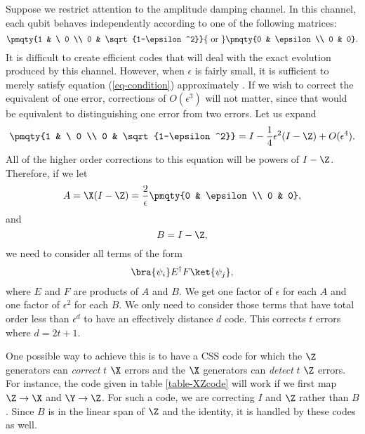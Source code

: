 Suppose we restrict attention to the amplitude damping channel.  In this
channel, each qubit behaves independently according to one of the following
matrices:
\begin{equation}
	\pmqty{1 & \ 0 \\ 0 & \sqrt{1-\epsilon^2}} {\rm\ or\ }
	\pmqty{0 & \epsilon \\ 0 & 0}.
\end{equation}
It is difficult to create efficient codes that will deal with the exact
evolution produced by this channel.  However, when $\epsilon$ is fairly small,
it is sufficient to merely satisfy equation (\ref{eq-condition}) approximately
\cite{leung}.  If we wish to correct the equivalent of one error, corrections
of $O(\epsilon^3)$ will not matter, since that would be equivalent to
distinguishing one error from two errors.  Let us expand
\begin{equation}
	\pmqty{1 & \ 0 \\ 0 & \sqrt{1-\epsilon^2}} =
	I - \frac{1}{4} \epsilon^2 (I - \Z) + O(\epsilon^4).
\end{equation}
All of the higher order corrections to this equation will be powers of
$I - \Z$.  Therefore, if we let
\begin{equation}
	A = \X (I - \Z) = \frac{2}{\epsilon} \pmqty{0 & \epsilon \\ 0 & 0},
\end{equation}
and
\begin{equation}
	B = I - \Z,
\end{equation}
we need to consider all terms of the form
\begin{equation}
	\bra{\psi_i} E^\dagger F \ket{\psi_j},
\end{equation}
where $E$ and $F$ are products of $A$ and $B$.  We get one factor of $\epsilon$
for each $A$ and one factor of $\epsilon^2$ for each $B$.  We only need to
consider those terms that have total order less than $\epsilon^d$ to have an
effectively distance $d$ code.  This corrects $t$ errors where $d= 2t+1$.

One possible way to achieve this is to have a CSS code for which the $\Z$
generators can {\em correct} $t$ $\X$ errors and the $\X$ generators can
	{\em detect} $t$ $\Z$ errors.  For instance, the code given in table
\ref{table-XZcode} will work if we first map $\Z \rightarrow \X$ and $\Y
\rightarrow \Z$.  For such a code, we are correcting $I$ and $\Z$ rather than
$B$.  Since $B$ is in the linear span of $\Z$ and the identity, it is handled
by these codes as well.

